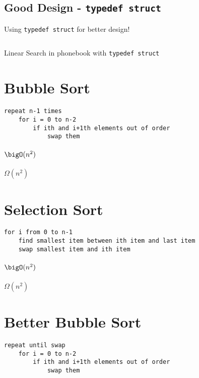 \subsection{\texorpdfstring{Good Design - \texttt{typedef struct}}{}}
Using \texttt{typedef struct} for better design!
\begin{code}
	\inputminted[linenos,breaklines]{c}{codes/src3/phonebook1.c}
	\caption{Linear Search in phonebook with \texttt{typedef struct}}
\end{code}

\section{Bubble Sort}
\begin{code}
	\begin{verbatim}
repeat n-1 times
	for i = 0 to n-2
		if ith and i+1th elements out of order
			swap them
	\end{verbatim}
\end{code}
\paragraph{$\bigO(n^2)$}
\paragraph{$\Omega(n^2)$}
\section{Selection Sort}
\begin{code}
	\begin{verbatim}
for i from 0 to n-1
	find smallest item between ith item and last item
	swap smallest item and ith item
	\end{verbatim}
\end{code}
\paragraph{$\bigO(n^2)$}
\paragraph{$\Omega(n^2)$}
\clearpage
\section{Better Bubble Sort}
\begin{code}
	\begin{verbatim}
repeat until swap
	for i = 0 to n-2
		if ith and i+1th elements out of order
			swap them
	\end{verbatim}
\end{code}
